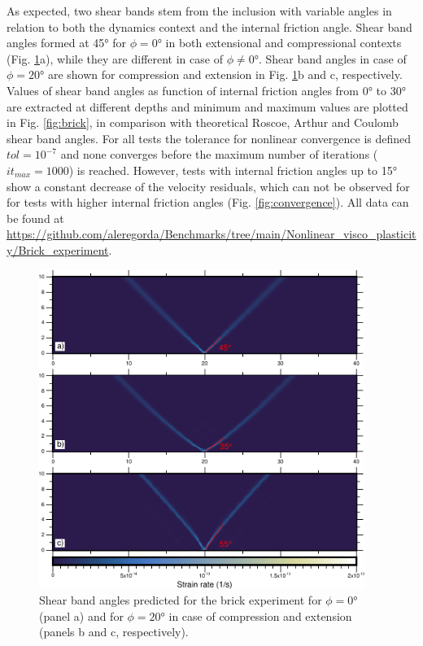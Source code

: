 \documentclass[hidelinks,10pt,a4paper]{article}
\begin{document}
As expected, two shear bands stem from the inclusion with variable angles in relation to both the dynamics context and the internal friction angle. Shear band
angles formed at 45° for $\phi=0$° in both extensional and compressional contexts (Fig. \ref{fig:brick_beam}a), while they are different in case of $\phi\neq0$°.
Shear band angles in case of $\phi=20$° are shown for compression and extension in Fig. \ref{fig:brick_beam}b  and c, respectively. Values of shear band angles
as function of internal friction angles from 0° to 30° are extracted at different depths and minimum and maximum values are plotted in Fig. \ref{fig:brick},
in comparison with theoretical Roscoe, Arthur and Coulomb shear band angles. For all tests the tolerance for nonlinear convergence is defined $tol=10^{-7}$
and none converges before the maximum number of iterations ($it_{max}=1000$) is reached. However, tests with internal friction angles up to 15° show a constant
decrease of the velocity residuals, which can not be observed for for tests with higher internal friction angles (Fig. \ref{fig:convergence}). 
All data can be found at \url{https://github.com/aleregorda/Benchmarks/tree/main/Nonlinear_visco_plasticity/Brick_experiment}.

\begin{figure}
\centering
\noindent\includegraphics[width=400px]{./Figures/Brick_Beam.pdf}
\caption{Shear band angles predicted for the brick experiment for $\phi=0$° (panel a) and for $\phi=20$° in case of compression and extension (panels b and c,
respectively).}
\label{fig:brick_beam}
\end{figure}
\end{document}
